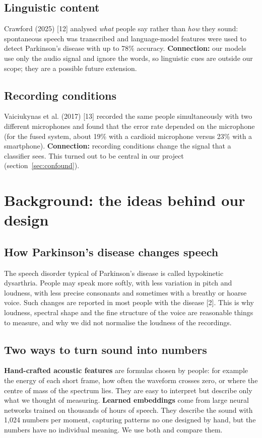 \documentclass[11pt,a4paper]{article}
\begin{document}
\subsection{Linguistic content}
Crawford (2025) [12] analysed \emph{what} people say rather than \emph{how} they sound: spontaneous speech was transcribed and language-model features were used to detect Parkinson's disease with up to 78\% accuracy. \textbf{Connection:} our models use only the audio signal and ignore the words, so linguistic cues are outside our scope; they are a possible future extension.

\subsection{Recording conditions}
Vaiciukynas et al. (2017) [13] recorded the same people simultaneously with two different microphones and found that the error rate depended on the microphone (for the fused system, about 19\% with a cardioid microphone versus 23\% with a smartphone). \textbf{Connection:} recording conditions change the signal that a classifier sees. This turned out to be central in our project (section~\ref{sec:confound}).

\section{Background: the ideas behind our design}\label{sec:background}
\subsection{How Parkinson's disease changes speech}
The speech disorder typical of Parkinson's disease is called hypokinetic dysarthria. People may speak more softly, with less variation in pitch and loudness, with less precise consonants and sometimes with a breathy or hoarse voice. Such changes are reported in most people with the disease [2]. This is why loudness, spectral shape and the fine structure of the voice are reasonable things to measure, and why we did not normalise the loudness of the recordings.

\subsection{Two ways to turn sound into numbers}
\textbf{Hand-crafted acoustic features} are formulas chosen by people: for example the energy of each short frame, how often the waveform crosses zero, or where the centre of mass of the spectrum lies. They are easy to interpret but describe only what we thought of measuring. \textbf{Learned embeddings} come from large neural networks trained on thousands of hours of speech. They describe the sound with 1,024 numbers per moment, capturing patterns no one designed by hand, but the numbers have no individual meaning. We use both and compare them.
\end{document}
